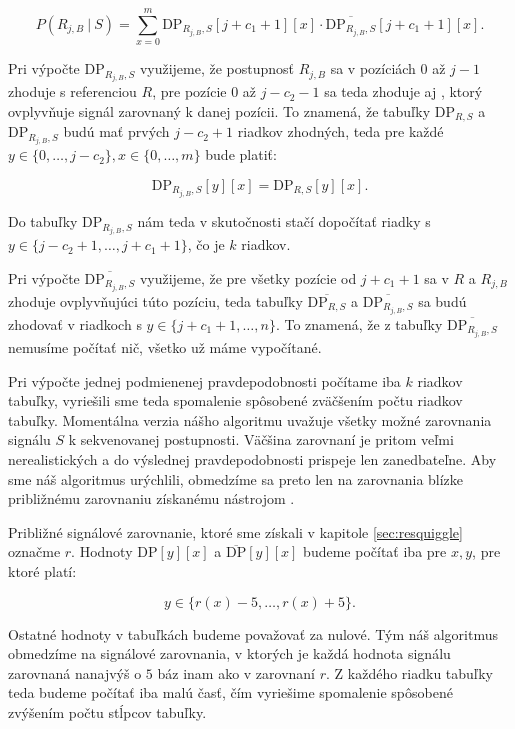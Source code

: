 $$P(R_{j,B} ~|~ S) = \sum\limits_{x = 0}^m \mathrm{DP}_{R_{j,B},S}[j+c_1+1][x] \cdot \overline{\mathrm{DP}_{R_{j,B},S}}[j+c_1+1][x]\text{.}$$ 

Pri výpočte $\mathrm{DP}_{R_{j,B},S}$ využijeme, že postupnosť $R_{j,B}$ sa v pozíciách $0$ až $j-1$
zhoduje s referenciou $R$, pre pozície $0$ až $j-c_2-1$ sa teda zhoduje aj \kmer{}, ktorý ovplyvňuje
signál zarovnaný k danej pozícii. To znamená, že tabuľky $\mathrm{DP}_{R,S}$ a 
$\mathrm{DP}_{R_{j,B},S}$ budú mať prvých $j-c_2+1$ riadkov zhodných, teda pre každé $y \in \{0, \dots, j-c_2\}, x \in \{0, \dots, m\}$ bude platiť:

$$\mathrm{DP}_{R_{j,B},S}[y][x] = \mathrm{DP}_{R,S}[y][x]\text{.}$$

Do tabuľky $\mathrm{DP}_{R_{j,B},S}$ nám teda v skutočnosti stačí dopočítať riadky s $y \in \{j-c_2+1, \dots, j+c_1+1\}$, čo je $k$ riadkov.

Pri výpočte $\overline{\mathrm{DP}_{R_{j,B},S}}$ využijeme, že pre všetky pozície od $j+c_1+1$ sa
v $R$ a $R_{j,B}$ zhoduje \kmer{} ovplyvňujúci túto pozíciu, teda tabuľky 
$\overline{\mathrm{DP}_{R, S}}$ a $\overline{\mathrm{DP}_{R_{j,B}, S}}$ sa budú zhodovať v riadkoch s 
$y \in \{j + c_1 + 1, \dots, n\}$. To znamená, že z tabuľky $\overline{\mathrm{DP}_{R_{j,B},S}}$ 
nemusíme počítať nič, všetko už máme vypočítané.

Pri výpočte jednej podmienenej pravdepodobnosti počítame iba $k$ riadkov tabuľky, vyriešili sme
teda spomalenie spôsobené zväčšením počtu riadkov tabuľky. 
Momentálna verzia nášho algoritmu uvažuje všetky možné zarovnania signálu $S$
k sekvenovanej postupnosti. Väčšina zarovnaní je pritom veľmi nerealistických a do výslednej
pravdepodobnosti prispeje len zanedbateľne. Aby sme náš algoritmus urýchlili, obmedzíme sa preto len
na zarovnania blízke približnému zarovnaniu získanému nástrojom \resquiggle{}.

Približné signálové zarovnanie, ktoré sme získali v kapitole \ref{sec:resquiggle} označme $r$. Hodnoty
$\mathrm{DP}[y][x]$ a $\overline{\mathrm{DP}}[y][x]$ budeme počítať iba pre $x, y$, pre ktoré
platí:

$$y \in \{r(x)-5, \dots, r(x)+5\}\text{.}$$

Ostatné hodnoty v tabuľkách budeme považovať za nulové. Tým náš algoritmus obmedzíme na signálové
zarovnania, v ktorých je každá hodnota signálu zarovnaná nanajvýš o $5$ báz inam ako v zarovnaní $r$.
Z každého riadku tabuľky teda budeme počítať iba malú časť, čím vyriešime spomalenie spôsobené
zvýšením počtu stĺpcov tabuľky.

